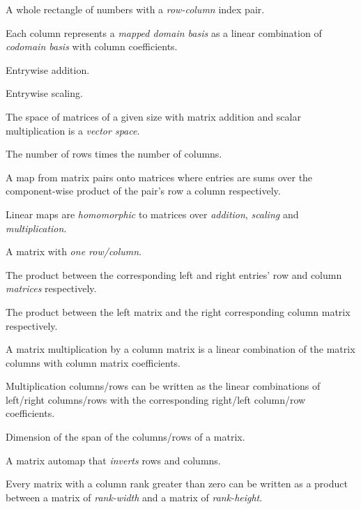\begin{multicols}{3}
  A whole rectangle of numbers with a \textit{row-column} index pair.
  
  Each column represents a \textit{mapped domain basis} as a linear combination of \textit{codomain basis} with column coefficients.

  Entrywise addition.

  Entrywise scaling.
  
  The space of matrices of a given size with matrix addition and scalar multiplication is a \textit{vector space}.
  
  The number of rows times the number of columns.

  A map from matrix pairs onto matrices where entries are sums over the component-wise product of
  the pair's row a column respectively.
  
  Linear maps are \textit{homomorphic} to matrices over \textit{addition}, \textit{scaling} and \textit{multiplication}.

  A matrix with \textit{one row/column}.

  The product between the corresponding left and right entries' row and column \textit{matrices} respectively.

  The product between the left matrix and the right corresponding column matrix respectively.

  A matrix multiplication by a column matrix is a linear combination of the
  matrix columns with column matrix coefficients.

  Multiplication columns/rows can be written as the linear combinations of
  left/right columns/rows with
  the corresponding right/left column/row coefficients.
  
  Dimension of the span of the columns/rows of a matrix.

  A matrix automap that \textit{inverts} rows and columns.

  Every matrix with a column rank greater than zero
  can be written as a product between
  a matrix of \textit{rank-width} and a matrix of \textit{rank-height}.


\end{multicols}
